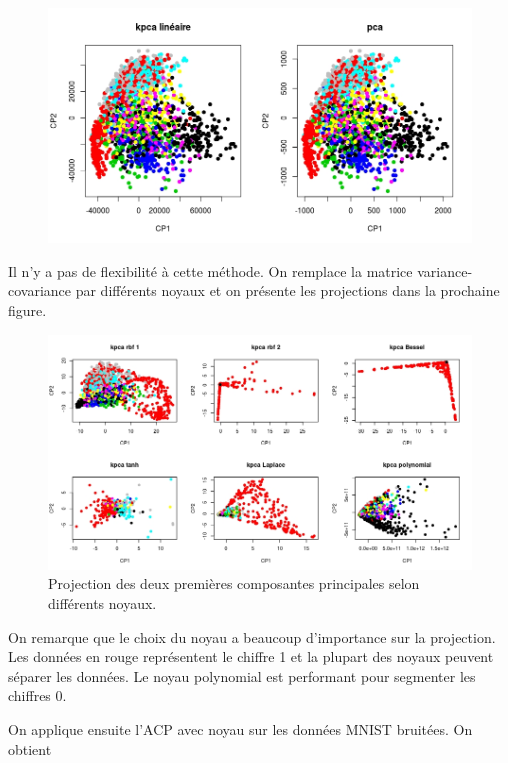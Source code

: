 \begin{figure}[H]
	\includegraphics[width=\textwidth]{comparaison-lineaire}
\end{figure}

Il n'y a pas de flexibilité à cette méthode. On remplace la matrice variance-covariance par différents noyaux et on présente les projections dans la prochaine figure. 

\begin{figure}[H]
	\includegraphics[width=\textwidth]{comparaison-kernel}
	\caption{Projection des deux premières composantes principales selon différents noyaux.}
\end{figure}

On remarque que le choix du noyau a beaucoup d'importance sur la projection. Les données en rouge représentent le chiffre 1 et la plupart des noyaux peuvent séparer les données. Le noyau polynomial est performant pour segmenter les chiffres 0. 

On applique ensuite l'ACP avec noyau sur les données MNIST bruitées. On obtient 

